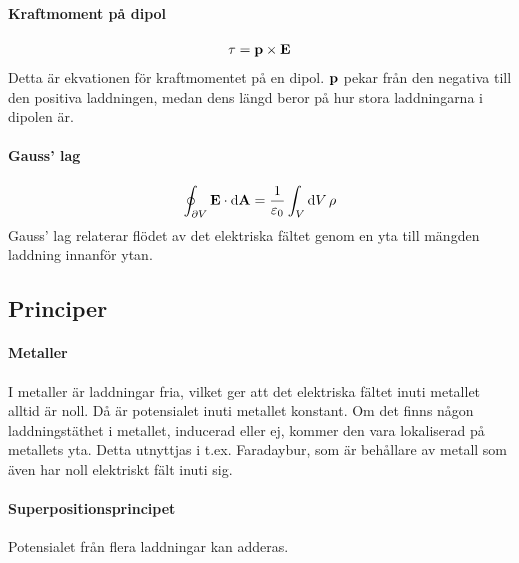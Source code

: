 \paragraph{Kraftmoment på dipol}
\begin{align*}
	\vect{\tau} = \vect{p}\times\vect{E}
\end{align*}
Detta är ekvationen för kraftmomentet på en dipol. $\vect{p}$ pekar från den negativa till den positiva laddningen, medan dens längd beror på hur stora laddningarna i dipolen är.

\deriv

\paragraph{Gauss' lag}
\begin{align*}
	\oint_{\partial V}\vect{E}\cdot\dd{\vect{A}} = \frac{1}{\varepsilon_0}\int_{V}\dd{V}\rho
\end{align*}
Gauss' lag relaterar flödet av det elektriska fältet genom en yta till mängden laddning innanför ytan.

\deriv

\subsection{Principer}

\paragraph{Metaller}
I metaller är laddningar fria, vilket ger att det elektriska fältet inuti metallet alltid är noll. Då är potensialet inuti metallet konstant. Om det finns någon laddningstäthet i metallet, inducerad eller ej, kommer den vara lokaliserad på metallets yta. Detta utnyttjas i t.ex. Faradaybur, som är behållare av metall som även har noll elektriskt fält inuti sig.

\paragraph{Superpositionsprincipet}
Potensialet från flera laddningar kan adderas.